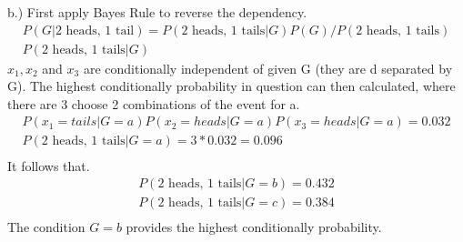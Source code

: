\documentclass[12pt]{article}
\begin{document}
\begin{figure}
\centering
{}
\qquad
{}
\end{figure}
b.) First apply Bayes Rule to reverse the dependency.
\begin{align}
P(G|\text{2 heads, 1 tail}) = P(\text{2 heads, 1 tails}|G)P(G)/P(\text{2 heads, 1 tails})\\
P(\text{2 heads, 1 tails}|G)
\end{align}
$x_1, x_2$ and $x_3$ are conditionally independent of given G (they are d separated by G). The highest conditionally probability in question can then calculated, where there are 3 choose 2 combinations of the event for a.
\begin{align}
P(x_1 = tails | G = a)P(x_2 = heads|G = a)P(x_3 = heads|G = a) = 0.032\\
P(\text{2 heads, 1 tails}| G = a) = 3 * 0.032 = 0.096\\
\end{align}
It follows that.
\begin{align}
P(\text{2 heads, 1 tails} | G = b) = 0.432\\
P(\text{2 heads, 1 tails} | G = c) = 0.384\\
\end{align}
The condition $G=b$ provides the highest conditionally probability.
\end{document}
